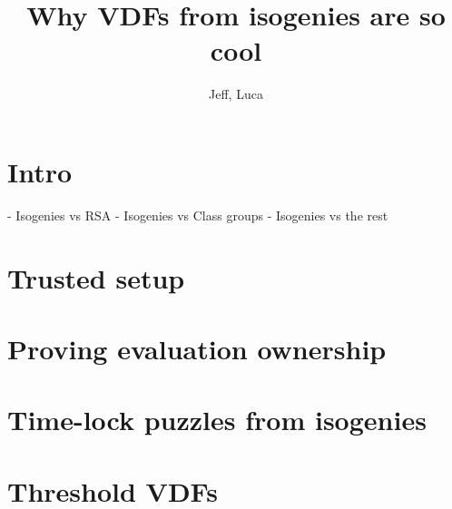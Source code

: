 \documentclass{article}
\title{Why VDFs from isogenies are so cool}
\author{Jeff, Luca}
\date{}
\begin{document}
\maketitle

\section{Intro}

- Isogenies vs RSA
- Isogenies vs Class groups
- Isogenies vs the rest

\section{Trusted setup}

\section{Proving evaluation ownership}



\section{Time-lock puzzles from isogenies}


\section{Threshold VDFs}
\end{document}
